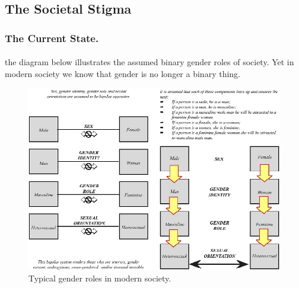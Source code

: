 \subsection{The Societal Stigma}
\subsubsection{The Current State.}
\paragraph{}
the diagram below illustrates the assumed binary gender roles of society. Yet in
modern society we know that gender is no longer a binary thing.

\begin{figure}[h!]
	\centering{}
		\includegraphics[scale=0.6]{figures/gender-roles}
	\caption{Typical gender roles in modern society.\cite[figure 3.3-3.4]{UDGIE}}
\end{figure}


\newpage
\printbibliography{}
